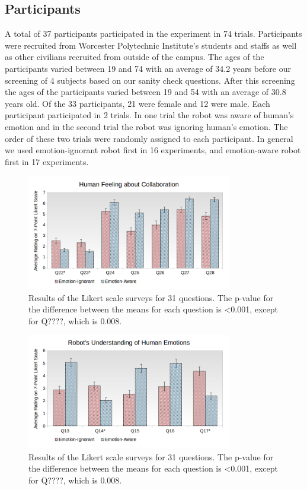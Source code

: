 \documentclass[12pt]{report}
\begin{document}
\vspace*{-5mm}
\subsection{Participants}
\label{sec:Participants}
A total of 37 participants participated in the experiment in 74 trials.
Participants were recruited from Worcester Polytechnic Institute's students and
staffs as well as other civilians recruited from outside of the campus. The ages
of the participants varied between 19 and 74 with an average of 34.2 years
before our screening of 4 subjects based on our sanity check questions. After
this screening the ages of the participants varied between 19 and 54 with an
average of 30.8 years old. Of the 33 participants, 21 were female and 12
were male. Each participant participated in 2 trials. In one trial the robot was
aware of human's emotion and in the second trial the robot was ignoring human's
emotion. The order of these two trials were randomly assigned to each
participant. In general we used emotion-ignorant robot first in 16 experiments,
and emotion-aware robot first in 17 experiments.

\begin{figure}
\centering
\includegraphics[width=0.8\textwidth]{figure/Overall-Collaboration.png}
\caption{Results of the Likert scale surveys for 31 questions. The p-value for
the difference between the means for each question is <0.001, except for Q????,
which is 0.008.}
\label{fig:overall-collaboration}
\end{figure}

\begin{figure}
\centering
\includegraphics[width=0.8\textwidth]{figure/Overall-Emotions.png}
\caption{Results of the Likert scale surveys for 31 questions. The p-value for
the difference between the means for each question is <0.001, except for Q????,
which is 0.008.}
\label{fig:overall-emotions}
\end{figure}
\end{document}
